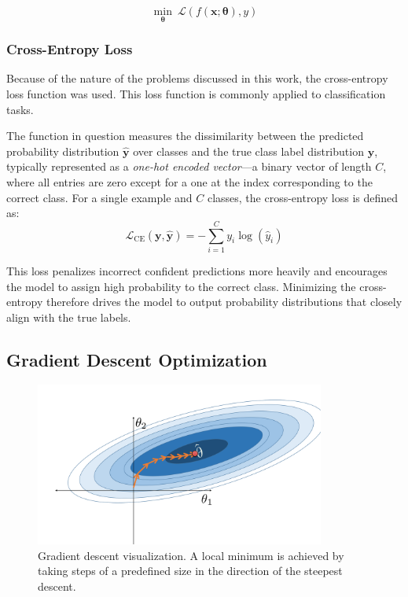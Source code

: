 \documentclass{pracalicmgr}
\begin{document}
\[
\min_{\boldsymbol{\theta}} \ \mathcal{L}(f(\mathbf{x}; \boldsymbol{\theta}), y)
\]

\subsubsection{Cross-Entropy Loss}

Because of the nature of the problems discussed in this work, the cross-entropy loss function was used. This loss function is commonly applied to classification tasks.

The function in question measures the dissimilarity between the predicted probability distribution \( \hat{\mathbf{y}} \) over classes and the true class label distribution \( \mathbf{y} \), typically represented as a \textit{one-hot encoded vector}—a binary vector of length \( C \), where all entries are zero except for a one at the index corresponding to the correct class. For a single example and \( C \) classes, the cross-entropy loss is defined as:
\[
\mathcal{L}_{\text{CE}}(\mathbf{y}, \hat{\mathbf{y}}) = -\sum_{i=1}^{C} y_i \log(\hat{y}_i)
\]

This loss penalizes incorrect confident predictions more heavily and encourages the model to assign high probability to the correct class. Minimizing the cross-entropy therefore drives the model to output probability distributions that closely align with the true labels.

\subsection{Gradient Descent Optimization}

\begin{figure}[H]
    \centering
    \includegraphics[width=0.85\textwidth]{src/gradienDescent.png}
    \caption{Gradient descent visualization. A local minimum is achieved by taking steps of a predefined size in the direction of the steepest descent\cite{Lau2023LearningDS}.}
\end{figure}
\end{document}
